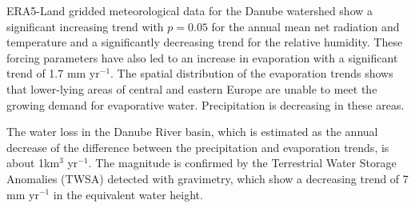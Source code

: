

\newpage{}
{}
\begin{flushleft}






\end{flushleft}

\noindent

ERA5-Land gridded meteorological data for the Danube watershed show a significant increasing trend with $p=0.05$ for the annual mean net radiation and temperature and a significantly decreasing trend for the relative humidity. These forcing parameters have also led to an increase in evaporation with a significant trend of 1.7 mm yr$^{-1}$. The spatial distribution of the evaporation trends shows that lower-lying areas of central and eastern Europe are unable to meet the growing demand for evaporative water. Precipitation is decreasing in these areas.

The water loss in the Danube River basin, which is estimated as the annual decrease of the difference between the precipitation and evaporation trends, is about 1km$^3$ yr$^{-1}$. The magnitude is confirmed by the Terrestrial Water Storage Anomalies (TWSA) detected with gravimetry, which show a decreasing trend of 7 mm yr$^{-1}$ in the equivalent water height.

